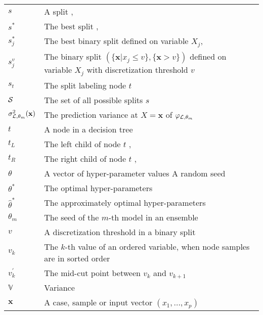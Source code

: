 \begin{tabularx}{\textwidth}{ l X }
$s$ & A split \dotfill  \pageref{ntn:s}, \pageref{ntn:s2}\\
$s^*$ & The best split \dotfill  \pageref{ntn:s-star}, \pageref{eqn:best-best-split}\\
$s^*_j$ & The best binary split defined on variable $X_j$\dotfill  \pageref{ntn:s-star}, \pageref{eqn:best-split-single}\\
$s_j^v$ & The binary split $(\{\mathbf{x}|x_j \leq v\}, \{\mathbf{x} > v\})$ defined on variable $X_j$ with discretization threshold $v$ \dotfill  \pageref{ntn:s_jv}\\
$s_t$ & The split labeling node $t$ \dotfill  \pageref{ntn:s_t}\\
${\cal S}$ & The set of all possible splits $s$ \dotfill  \pageref{ntn:S-all}\\
$\sigma^2_{{\cal L},\theta_m}(\mathbf{x})$ & The prediction variance at $X = \mathbf{x}$ of $\varphi_{{\cal L},\theta_m}$ \dotfill \pageref{eqn:4:sigma} \\
$t$ & A node in a decision tree \dotfill  \pageref{ntn:node}\\
$t_L$ & The left child of node $t$ \dotfill \pageref{ntn:t_L}, \pageref{ntn:t_L2}\\
$t_R$ & The right child of node $t$ \dotfill \pageref{ntn:t_R}, \pageref{ntn:t_R2}\\
$\theta$ & A vector of hyper-parameter values \dotfill  \pageref{ntn:theta}\newline A random seed \dotfill \pageref{ntn:theta-seed}\\
$\theta^*$ & The optimal hyper-parameters \dotfill  \pageref{ntn:theta-star}\\
$\widehat{\theta}^*$ & The approximately optimal hyper-parameters \dotfill  \pageref{ntn:theta-star-approx}\\
$\theta_m$ & The seed of the $m$-th model in an ensemble \dotfill  \pageref{ntn:theta-seed-m}\\
$v$ & A discretization threshold in a binary split \dotfill  \pageref{ntn:v}\\
$v_k$ & The $k$-th value of an ordered variable, when node samples are in sorted order \dotfill  \pageref{ntn:v_k}\\
$v_k^\prime$ & The mid-cut point between $v_k$ and $v_{k+1}$ \dotfill  \pageref{ntn:v_k_prime}\\
$\mathbb{V}$ & Variance \dotfill \\
$\textbf{x}$ & A case, sample or input vector $(x_1, \dots, x_p)$ \dotfill  \pageref{ntn:sample-x}\\

\end{tabularx}
